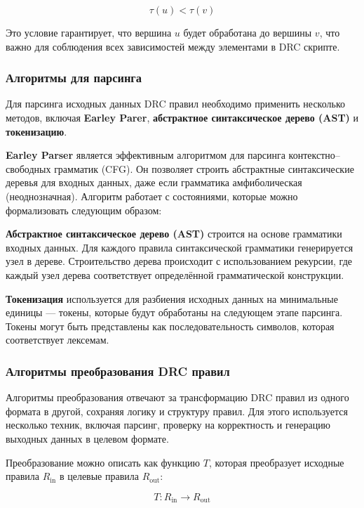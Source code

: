 \begin{equation}
\tau(u) < \tau(v)
\end{equation}

Это условие гарантирует,
что вершина \( u \) будет обработана до вершины \( v \),
что важно для соблюдения всех зависимостей между элементами в DRC скрипте.

\subsubsection{Алгоритмы для парсинга}

Для парсинга исходных данных DRC правил необходимо применить несколько методов,
включая \textbf{Earley Parer}, \textbf{абстрактное синтаксическое дерево (AST)}
и \textbf{токенизацию}.

\textbf{Earley Parser} является эффективным алгоритмом
для парсинга контекстно--свободных грамматик (CFG).
Он позволяет строить абстрактные синтаксические деревья для входных данных,
даже если грамматика амфиболическая (неоднозначная).
Алгоритм работает с состояниями, которые можно формализовать следующим образом:

\textbf{Абстрактное синтаксическое дерево (AST)}
строится на основе грамматики входных данных.
Для каждого правила синтаксической грамматики генерируется узел в дереве.
Строительство дерева происходит с использованием рекурсии,
где каждый узел дерева соответствует определённой грамматической конструкции.

\textbf{Токенизация} используется
для разбиения исходных данных на минимальные единицы --- токены,
которые будут обработаны на следующем этапе парсинга.
Токены могут быть представлены как последовательность символов,
которая соответствует лексемам.

\subsubsection{Алгоритмы преобразования DRC правил}

Алгоритмы преобразования отвечают за трансформацию DRC правил
из одного формата в другой, сохраняя логику и структуру правил.
Для этого используется несколько техник, включая парсинг,
проверку на корректность и генерацию выходных данных в целевом формате.

Преобразование можно описать как функцию \( T \),
которая преобразует исходные правила \( R_{\text{in}} \)
в целевые правила \( R_{\text{out}} \):

\begin{equation}
T: R_{\text{in}} \to R_{\text{out}}
\end{equation}

